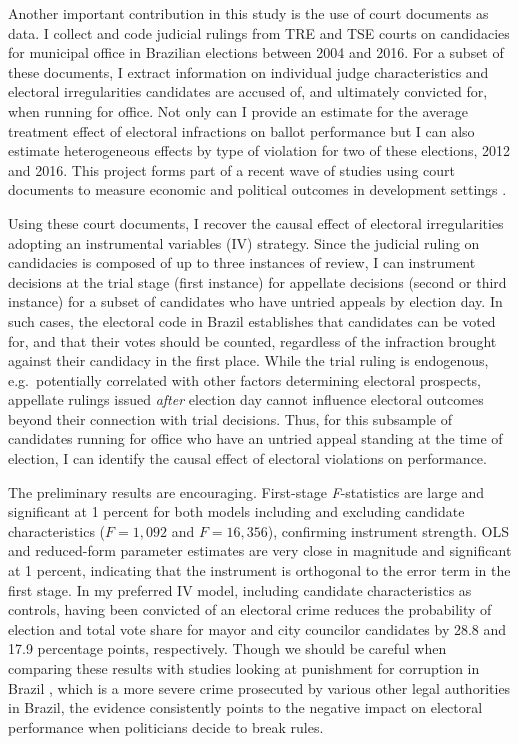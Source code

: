 \documentclass[11pt]{article}
\begin{document}
Another important contribution in this study is the use of court documents as data. I collect and code judicial rulings from TRE and TSE courts on candidacies for municipal office in Brazilian elections between 2004 and 2016. For a subset of these documents, I extract information on individual judge characteristics and electoral irregularities candidates are accused of, and ultimately convicted for, when running for office. Not only can I provide an estimate for the average treatment effect of electoral infractions on ballot performance but I can also estimate heterogeneous effects by type of violation for two of these elections, 2012 and 2016. This project forms part of a recent wave of studies using court documents to measure economic and political outcomes in development settings \citep{Sanchez-MartinezDismantlingInstitutionsCourt2018,LambaisJudicialSubversionEvidence2018}.

Using these court documents, I recover the causal effect of electoral irregularities adopting an instrumental variables (IV) strategy. Since the judicial ruling on candidacies is composed of up to three instances of review, I can instrument decisions at the trial stage (first instance) for appellate decisions (second or third instance) for a subset of candidates who have untried appeals by election day. In such cases, the electoral code in Brazil establishes that candidates can be voted for, and that their votes should be counted, regardless of the infraction brought against their candidacy in the first place. While the trial ruling is endogenous, e.g.~potentially correlated with other factors determining electoral prospects, appellate rulings issued \emph{after} election day cannot influence electoral outcomes beyond their connection with trial decisions. Thus, for this subsample of candidates running for office who have an untried appeal standing at the time of election, I can identify the causal effect of electoral violations on performance.

The preliminary results are encouraging. First-stage \emph{F}-statistics are large and significant at 1 percent for both models including and excluding candidate characteristics ($F = 1{,}092$ and $F = 16{,}356$), confirming instrument strength. OLS and reduced-form parameter estimates are very close in magnitude and significant at 1 percent, indicating that the instrument is orthogonal to the error term in the first stage. In my preferred IV model, including candidate characteristics as controls, having been convicted of an electoral crime reduces the probability of election and total vote share for mayor and city councilor candidates by 28.8 and 17.9 percentage points, respectively. Though we should be careful when comparing these results with studies looking at punishment for corruption in Brazil \citep{FerrazExposingCorruptPoliticians2008b,FerrazElectoralAccountabilityCorruption2011a,WintersLackingInformationCondoning2013}, which is a more severe crime prosecuted by various other legal authorities in Brazil, the evidence consistently points to the negative impact on electoral performance when politicians decide to break rules.
\end{document}
